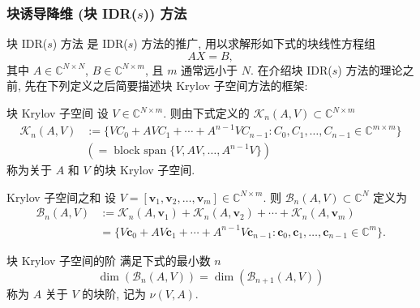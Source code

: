 \subsubsection{{块诱导降维 (块 IDR($s$)) 方法}}\label{subsec:block-idr-method}
{块 IDR($s$) 方法  是 IDR($s$) 方法的推广, 用以求解形如下式的块线性方程组}
\begin{equation}\label{eq:block-linear-system}AX=B,\end{equation}
{其中 $A\in\mathbb C^{N\times N}$, $B\in\mathbb C^{N\times m}$, 且 $m$ 通常远小于 $N$.}
{在介绍块 IDR($s$) 方法的理论之前, 先在下列定义之后简要描述块 Krylov 子空间方法的框架:}
\par{}
\begin{Definition}{{块 Krylov 子空间}}\label{def:block-krylov-subspace}
{设 $V\in\mathbb C^{N\times m}$. 则由下式定义的 $\mathcal K_n(A,V)\subset\mathbb C^{N\times m}$}
\[\begin{aligned}\mathcal K_n(A,V)&:=\{VC_0+AVC_1+\cdots+A^{n-1}VC_{n-1}:C_0,C_1,\ldots,C_{n-1}\in\mathbb C^{m\times m}\}\\&(=\operatorname{block\ span}\{V,AV,\ldots,A^{n-1}V\})\end{aligned}\]
{称为关于 $A$ 和 $V$ 的块 Krylov 子空间.}
\end{Definition}
\par{}
\begin{Definition}{{Krylov 子空间之和}}\label{def:block-krylov-sum}
{设 $V=[\bm v_1,\bm v_2,\ldots,\bm v_m]\in\mathbb C^{N\times m}$. 则 $\mathcal B_n(A,V)\subset\mathbb C^N$ 定义为}
\[\begin{aligned}\mathcal B_n(A,V)&:=\mathcal K_n(A,\bm v_1)+\mathcal K_n(A,\bm v_2)+\cdots+\mathcal K_n(A,\bm v_m)\\&=\{V\bm c_0+AV\bm c_1+\cdots+A^{n-1}V\bm c_{n-1}:\bm c_0,\bm c_1,\ldots,\bm c_{n-1}\in\mathbb C^m\}.\end{aligned}\]
\end{Definition}
\par{}
\begin{Definition}{{块 Krylov 子空间的阶}}\label{def:block-krylov-grade}
{满足下式的最小数 $n$}
\[\dim(\mathcal B_n(A,V))=\dim(\mathcal B_{n+1}(A,V))\]
{称为 $A$ 关于 $V$ 的块阶, 记为 $\nu(V,A)$.}
\end{Definition}
